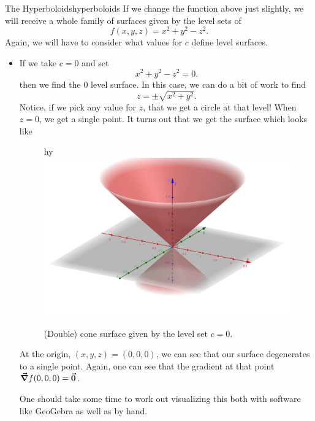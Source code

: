                \begin{ex}{The Hyperboloids}{hyperboloids}
                If we change the function above just slightly, we will receive a whole family of surfaces given by the level sets of
                \[
                f(x,y,z)=x^2+y^2-z^2.
                \]
                Again, we will have to consider what values for $c$ define level surfaces. 
                \begin{itemize}
                    \item If we take $c=0$ and set
                    \[
                    x^2+y^2-z^2=0.
                    \]
                    then we find the 0 level surface. In this case, we can do a bit of work to find
                    \[
                    z=\pm \sqrt{x^2+y^2}.
                    \]
                    Notice, if we pick any value for $z$, that we get a circle at that level!  When $z=0$, we get a single point.  It turns out that we get the  surface which looks like
                    \begin{figure}[H]hy
                        \centering
                     \includegraphics[width=.8\textwidth]{Figures_Part_6/cone_surface.png}
                     \caption{(Double) cone surface given by the level set $c=0$.}
                    \end{figure}
                    At the origin, $(x,y,z)=(0,0,0)$, we can see that our surface degenerates to a single point. Again, one can see that the gradient at that point $\boldsymbol{\vec{\nabla}} f(0,0,0) = \boldsymbol{\vec{0}}$.
                    
                    One should take some time to work out visualizing this both with software like GeoGebra as well as by hand.
                    

\end{itemize}
\end{ex}
